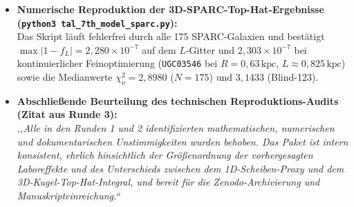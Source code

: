 \documentclass[10pt,a4paper]{article}
\begin{document}
{\begin{itemize}
  \item \textbf{Numerische Reproduktion der 3D-SPARC-Top-Hat-Ergebnisse (\texttt{python3 tal\_7th\_model\_sparc.py}):}\\
  Das Skript l\"auft fehlerfrei durch alle 175 SPARC-Galaxien und best\"atigt $\max|1-f_L| = 2{,}280\times 10^{-7}$ auf dem $L$-Gitter und $2{,}303\times 10^{-7}$ bei kontinuierlicher Feinoptimierung (\texttt{UGC03546} bei $R = 0{,}63\,\text{kpc}$, $L \approx 0{,}825\,\text{kpc}$) sowie die Medianwerte $\chi^2_\nu = 2{,}8980$ ($N=175$) und $3{,}1433$ (Blind-123).

  \item \textbf{Abschlie\ss ende Beurteilung des technischen Reproduktions-Audits (Zitat aus Runde 3):}\\
  \textit{,,Alle in den Runden 1 und 2 identifizierten mathematischen, numerischen und dokumentarischen Unstimmigkeiten wurden behoben. Das Paket ist intern konsistent, ehrlich hinsichtlich der Gr\"o\ss enordnung der vorhergesagten Laboreffekte und des Unterschieds zwischen dem 1D-Scheiben-Proxy und dem 3D-Kugel-Top-Hat-Integral, und bereit f\"ur die Zenodo-Archivierung und Manuskripteinreichung.``}
\end{itemize}
}
\end{document}

